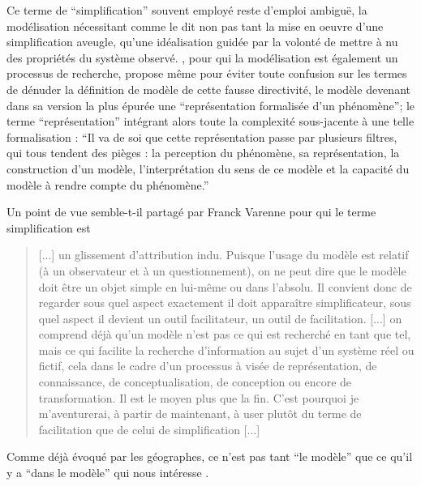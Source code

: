 Ce terme de \enquote{simplification} souvent employé reste d'emploi ambiguë, la modélisation nécessitant comme le dit \textcite{Haggett1965} non pas tant la mise en oeuvre d'une simplification aveugle, qu'une idéalisation guidée par la volonté de mettre à nu des propriétés du système observé. \textcite{Brunet2000}, pour qui la modélisation est également un processus de recherche, propose même pour éviter toute confusion sur les termes de dénuder la définition de modèle de cette fausse directivité, le modèle devenant dans sa version la plus épurée une \enquote{représentation formalisée d'un phénomène}; le terme \enquote{représentation} intégrant alors toute la complexité sous-jacente à une telle formalisation : \enquote{Il va de soi que cette représentation passe par plusieurs filtres, qui tous tendent des pièges : la perception du phénomène, sa représentation, la construction d'un modèle, l'interprétation du sens de ce modèle et la capacité du modèle à rendre compte du phénomène.}

Un point de vue semble-t-il partagé par Franck Varenne pour qui le terme simplification est \blockquote[{\cite{Varenne2008}}]{[...] un glissement d’attribution indu. Puisque l’usage du modèle est relatif (à un observateur et à un questionnement), on ne peut dire que le modèle doit être un objet simple en lui-même ou dans l’absolu. Il convient donc de regarder sous quel aspect exactement il doit apparaître simplificateur, sous quel aspect il devient un outil facilitateur, un outil de facilitation. [...] on comprend déjà qu’un modèle n’est pas ce qui est recherché en tant que tel, mais ce qui facilite la recherche d’information au sujet d’un système réel ou fictif, cela dans le cadre d’un processus à visée de représentation, de connaissance, de conceptualisation, de conception ou encore de transformation. Il est le moyen plus que la fin. C’est pourquoi je m’aventurerai, à partir de maintenant, à user plutôt du terme de facilitation que de celui de simplification [...]}.

Comme déjà évoqué par les géographes, ce n'est pas tant \enquote{le modèle} que ce qu'il y a \enquote{dans le modèle} qui nous intéresse \autocites{Sanders2000, Besse2000}.

